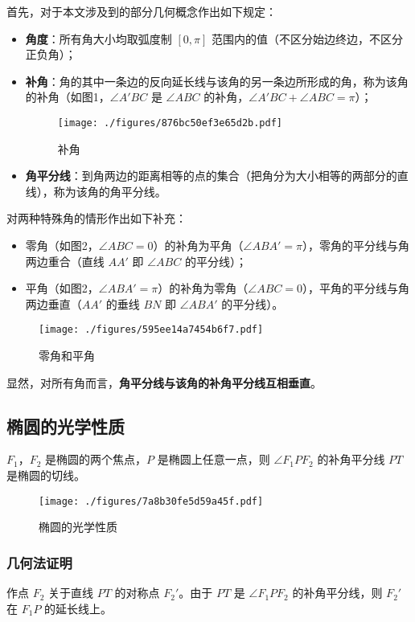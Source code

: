 

首先，对于本文涉及到的部分几何概念作出如下规定：
\begin{itemize}
\item \textbf{角度}：所有角大小均取弧度制 $[0,\pi]$ 范围内的值（不区分始边终边，不区分正负角）；
\item \textbf{补角}：角的其中一条边的反向延长线与该角的另一条边所形成的角，称为该角的补角（如图1，$\angle A'BC$ 是 $\angle ABC$ 的补角，$\angle A'BC + \angle ABC = \pi$）；
\begin{figure}[ht]
\centering
\texttt{[image: ./figures/876bc50ef3e65d2b.pdf]}
\caption{补角} \label{fig_ConOpt_1}
\end{figure}
\item \textbf{角平分线}：到角两边的距离相等的点的集合（把角分为大小相等的两部分的直线），称为该角的角平分线。
\end{itemize}
对两种特殊角的情形作出如下补充：
\begin{itemize}
\item 零角（如图2，$\angle ABC = 0$）的补角为平角（$\angle ABA' = \pi$），零角的平分线与角两边重合（直线 $AA'$ 即 $\angle ABC$ 的平分线）；
\item 平角（如图2，$\angle ABA' = \pi$）的补角为零角（$\angle ABC = 0$），平角的平分线与角两边垂直（$AA'$ 的垂线 $BN$ 即 $\angle ABA'$ 的平分线）。
\end{itemize}
\begin{figure}[ht]
\centering
\texttt{[image: ./figures/595ee14a7454b6f7.pdf]}
\caption{零角和平角} \label{fig_ConOpt_2}
\end{figure}
显然，对所有角而言，\textbf{角平分线与该角的补角平分线互相垂直}。

\subsection{椭圆的光学性质}
$F_1$，$F_2$ 是椭圆的两个焦点，$ P $ 是椭圆上任意一点，则 $\angle F_1PF_2 $ 的补角平分线 $ PT $ 是椭圆的切线。
\begin{figure}[ht]
\centering
\texttt{[image: ./figures/7a8b30fe5d59a45f.pdf]}
\caption{椭圆的光学性质} \label{fig_ConOpt_3}
\end{figure}
\subsubsection{几何法证明}
作点 $F_2$ 关于直线 $PT$ 的对称点 $F_2'$。由于 $PT$ 是 $\angle F_1PF_2 $ 的补角平分线，则 $F_2'$ 在 $F_1P$ 的延长线上。

